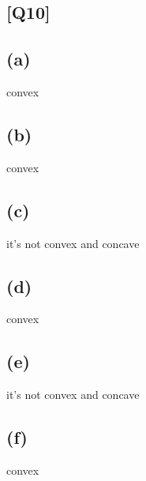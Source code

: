 \documentclass[12pt, a4 paper]{article}
\begin{document}
\begin{framed}
              \end{array}
        \right]
        $$
        \indent where, $a_{mi}$ means the $i$th element of column vector $a_{m}$

    \end{framed}

    \begin{framed}
        \section{[Q10]}
        \subsection{(a)}
        convex
        \subsection{(b)}
        convex
        \subsection{(c)}
        it's not convex and concave
        \subsection{(d)}
        convex
        \subsection{(e)}
        it's not convex and concave
        \subsection{(f)}
        convex
    \end{framed}
\end{document}

